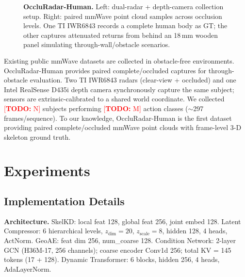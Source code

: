 \documentclass{article}
\newcommand{\todo}[1]{\textcolor{red}{[\textbf{TODO:} #1]}}
\begin{document}
\begin{figure}[t]
  \centering
  \caption{
    \textbf{OccluRadar-Human.}
    Left: dual-radar + depth-camera collection setup.
    Right: paired mmWave point cloud samples across occlusion levels.
    One TI IWR6843 records a complete human body as GT; the other captures
    attenuated returns from behind an 18\,mm wooden panel simulating
    through-wall/obstacle scenarios.
  }
  \label{fig:occludata}
\end{figure}

Existing public mmWave datasets are collected in obstacle-free environments.
OccluRadar-Human provides paired complete/occluded captures for through-obstacle
evaluation.
Two TI IWR6843 radars (clear-view + occluded) and one Intel RealSense D435i
depth camera synchronously capture the same subject; sensors are extrinsic-calibrated
to a shared world coordinate.
We collected \todo{N} subjects performing \todo{M} action classes
($\sim$297 frames/sequence).
To our knowledge, OccluRadar-Human is the first dataset providing paired
complete/occluded mmWave point clouds with frame-level 3-D skeleton ground truth.

\section{Experiments}
\label{sec:exp}

\subsection{Implementation Details}
\label{sec:impl}

\textbf{Architecture.}
SkelKD: local feat 128, global feat 256, joint embed 128.
Latent Compressor: 6 hierarchical levels, $z_\text{dim}\!=\!20$,
$z_\text{scale}\!=\!8$, hidden 128, 4 heads, ActNorm.
GeoAE: feat dim 256, num\_coarse 128.
Condition Network: 2-layer GCN (H36M-17, 256 channels);
coarse encoder Conv1d 256; total KV = 145 tokens (17 + 128).
Dynamic Transformer: 6 blocks, hidden 256, 4 heads, AdaLayerNorm.
\end{document}
